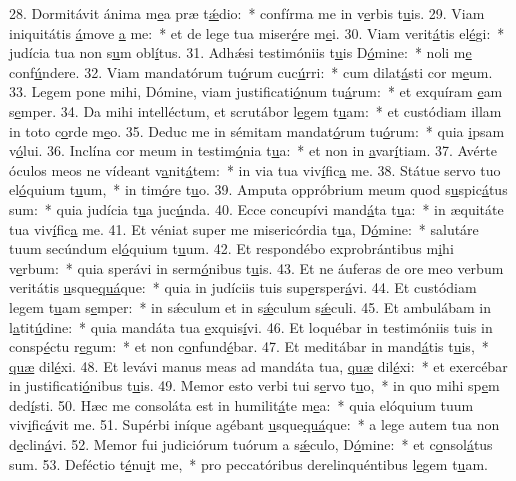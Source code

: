 28. Dormitávit ánima m\uline{e}a præ t\uline{ǽ}dio:~* confírma me in v\uline{e}rbis t\uline{u}is.
29. Viam iniquitátis \uline{á}move \uline{a} me:~* et de lege tua miser\uline{é}re m\uline{e}i.
30. Viam verit\uline{á}tis el\uline{é}gi:~* judícia tua non s\uline{u}m obl\uline{í}tus.
31. Adhǽsi testimóniis t\uline{u}is D\uline{ó}mine:~* noli m\uline{e} conf\uline{ú}ndere.
32. Viam mandatórum tu\uline{ó}rum cuc\uline{ú}rri:~* cum dilat\uline{á}sti cor m\uline{e}um.
33. Legem pone mihi, Dómine, viam justificati\uline{ó}num tu\uline{á}rum:~* et exquíram \uline{e}am s\uline{e}mper.
34. Da mihi intelléctum, et scrutábor l\uline{e}gem t\uline{u}am:~* et custódiam illam in toto c\uline{o}rde m\uline{e}o.
35. Deduc me in sémitam mandat\uline{ó}rum tu\uline{ó}rum:~* quia \uline{i}psam v\uline{ó}lui.
36. Inclína cor meum in testim\uline{ó}nia t\uline{u}a:~* et non in \uline{a}var\uline{í}tiam.
37. Avérte óculos meos ne vídeant v\uline{a}nit\uline{á}tem:~* in via tua viv\uline{í}fic\uline{a} me.
38. Státue servo tuo el\uline{ó}quium t\uline{u}um,~* in tim\uline{ó}re t\uline{u}o.
39. Amputa oppróbrium meum quod s\uline{u}spic\uline{á}tus sum:~* quia judícia t\uline{u}a juc\uline{ú}nda.
40. Ecce concupívi mand\uline{á}ta t\uline{u}a:~* in æquitáte tua viv\uline{í}fic\uline{a} me.
41. Et véniat super me misericórdia t\uline{u}a, D\uline{ó}mine:~* salutáre tuum secúndum el\uline{ó}quium t\uline{u}um.
42. Et respondébo exprobrántibus m\uline{i}hi v\uline{e}rbum:~* quia sperávi in serm\uline{ó}nibus t\uline{u}is.
43. Et ne áuferas de ore meo verbum veritátis \uline{u}sque\uline{quá}que:~* quia in judíciis tuis sup\uline{e}rsper\uline{á}vi.
44. Et custódiam legem t\uline{u}am s\uline{e}mper:~* in sǽculum et in s\uline{ǽ}culum s\uline{ǽ}culi.
45. Et ambulábam in l\uline{a}tit\uline{ú}dine:~* quia mandáta tua \uline{e}xquis\uline{í}vi.
46. Et loquébar in testimóniis tuis in consp\uline{é}ctu r\uline{e}gum:~* et non c\uline{o}nfund\uline{é}bar.
47. Et meditábar in mand\uline{á}tis t\uline{u}is,~* \uline{quæ} dil\uline{é}xi.
48. Et levávi manus meas ad mandáta tua, \uline{quæ} dil\uline{é}xi:~* et exercébar in justificati\uline{ó}nibus t\uline{u}is.
49. Memor esto verbi tui s\uline{e}rvo t\uline{u}o,~* in quo mihi sp\uline{e}m ded\uline{í}sti.
50. Hæc me consoláta est in humilit\uline{á}te m\uline{e}a:~* quia elóquium tuum viv\uline{i}fic\uline{á}vit me.
51. Supérbi iníque agébant \uline{u}sque\uline{quá}que:~* a lege autem tua non d\uline{e}clin\uline{á}vi.
52. Memor fui judiciórum tuórum a s\uline{ǽ}culo, D\uline{ó}mine:~* et c\uline{o}nsol\uline{á}tus sum.
53. Deféctio t\uline{é}nu\uline{i}t me,~* pro peccatóribus derelinquéntibus l\uline{e}gem t\uline{u}am.
